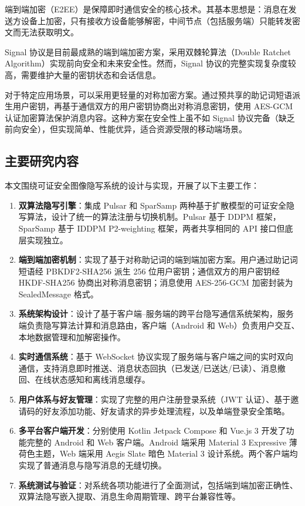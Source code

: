 端到端加密（E2EE）是保障即时通信安全的核心技术。其基本思想是：消息在发送方设备上加密，只有接收方设备能够解密，中间节点（包括服务端）只能转发密文而无法获取明文。

Signal 协议\supercite{marlinspike2016signal}是目前最成熟的端到端加密方案，采用双棘轮算法（Double Ratchet Algorithm）实现前向安全和未来安全性。然而，Signal 协议的完整实现复杂度较高，需要维护大量的密钥状态和会话信息。

对于特定应用场景，可以采用更轻量的对称加密方案。通过预共享的助记词短语派生用户密钥，再基于通信双方的用户密钥协商出对称消息密钥，使用 AES-GCM 认证加密算法保护消息内容。这种方案在安全性上虽不如 Signal 协议完备（缺乏前向安全），但实现简单、性能优异，适合资源受限的移动端场景。

\subsection{主要研究内容}

本文围绕可证安全图像隐写系统的设计与实现，开展了以下主要工作：

\begin{enumerate}
    \item \textbf{双算法隐写引擎}：集成 Pulsar 和 SparSamp 两种基于扩散模型的可证安全隐写算法，设计了统一的算法注册与切换机制。Pulsar 基于 DDPM 框架，SparSamp 基于 IDDPM P2-weighting 框架，两者共享相同的 API 接口但底层实现独立。
    \item \textbf{端到端加密机制}：实现了基于对称助记词的端到端加密方案。用户通过助记词短语经 PBKDF2-SHA256 派生 256 位用户密钥；通信双方的用户密钥经 HKDF-SHA256 协商出对称消息密钥；消息使用 AES-256-GCM 加密封装为 SealedMessage 格式。
    \item \textbf{系统架构设计}：设计了基于客户端--服务端的跨平台隐写通信系统架构，服务端负责隐写算法计算和消息路由，客户端（Android 和 Web）负责用户交互、本地数据管理和加解密操作。
    \item \textbf{实时通信系统}：基于 WebSocket 协议实现了服务端与客户端之间的实时双向通信，支持消息即时推送、消息状态回执（已发送/已送达/已读）、消息撤回、在线状态感知和离线消息缓存。
    \item \textbf{用户体系与好友管理}：实现了完整的用户注册登录系统（JWT 认证）、基于邀请码的好友添加功能、好友请求的异步处理流程，以及单端登录安全策略。
    \item \textbf{多平台客户端开发}：分别使用 Kotlin Jetpack Compose 和 Vue.js 3 开发了功能完整的 Android 和 Web 客户端。Android 端采用 Material 3 Expressive 薄荷色主题，Web 端采用 Aegis Slate 暗色 Material 3 设计系统。两个客户端均实现了普通消息与隐写消息的无缝切换。
    \item \textbf{系统测试与验证}：对系统各项功能进行了全面测试，包括端到端加密正确性、双算法隐写嵌入提取、消息生命周期管理、跨平台兼容性等。
\end{enumerate}

